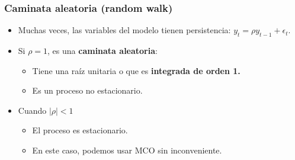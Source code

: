 \documentclass{beamer}
\begin{document}


\begin{frame}
\frametitle{Caminata aleatoria (random walk)}

\begin{itemize}
  \item Muchas veces, las variables del modelo tienen persistencia: $ y_t = \rho y_{t-1} + \epsilon_t $.
  \item Si \(\rho = 1\), es una \textbf{caminata aleatoria}:
  \begin{itemize}
    \item Tiene una raíz unitaria o que es \textbf{integrada de orden 1.}
    \item Es un proceso no estacionario.
  \end{itemize}
  \item Cuando \(|\rho| < 1\)
  \begin{itemize}
    \item El proceso es estacionario.
    \item En este caso, podemos usar MCO sin inconveniente.
  \end{itemize}
\end{itemize}

\end{frame}



\end{document}
